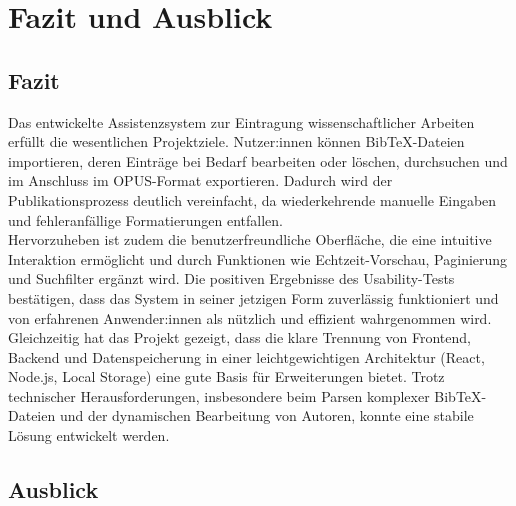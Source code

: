 \chapter{Fazit und Ausblick}

\section{Fazit}
Das entwickelte Assistenzsystem zur Eintragung wissenschaftlicher Arbeiten 
erfüllt die wesentlichen Projektziele. Nutzer:innen können BibTeX-Dateien 
importieren, deren Einträge bei Bedarf bearbeiten oder löschen, durchsuchen 
und im Anschluss im OPUS-Format exportieren. Dadurch wird der 
Publikationsprozess deutlich vereinfacht, da wiederkehrende manuelle 
Eingaben und fehleranfällige Formatierungen entfallen.\\

\noindent Hervorzuheben ist zudem die benutzerfreundliche Oberfläche, die eine intuitive 
Interaktion ermöglicht und durch Funktionen wie Echtzeit-Vorschau, Paginierung 
und Suchfilter ergänzt wird. Die positiven Ergebnisse des Usability-Tests 
bestätigen, dass das System in seiner jetzigen Form zuverlässig funktioniert 
und von erfahrenen Anwender:innen als nützlich und effizient wahrgenommen wird.\\

\noindent Gleichzeitig hat das Projekt gezeigt, dass die klare Trennung von Frontend, 
Backend und Datenspeicherung in einer leichtgewichtigen Architektur (React, 
Node.js, Local Storage) eine gute Basis für Erweiterungen bietet. Trotz 
technischer Herausforderungen, insbesondere beim Parsen komplexer 
BibTeX-Dateien und der dynamischen Bearbeitung von Autoren, konnte eine 
stabile Lösung entwickelt werden.

\section{Ausblick}